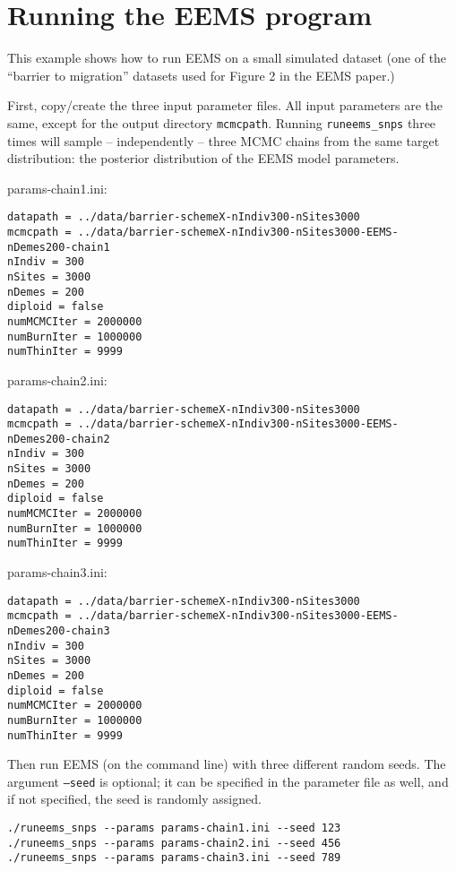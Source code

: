 \documentclass[a4paper,10pt,DIV=15,titlepage,mpinclude=true]{scrartcl}
\newcommand{\keystring}[1]{{\tt #1}}
\begin{document}
\newpage

\section{Running the EEMS program}\label{sec:running-eems}

This example shows how to run EEMS on a small simulated dataset (one of the ``barrier to migration'' datasets used for Figure 2 in the EEMS paper.)

First, copy/create the three input parameter files. All input parameters are the same, except for the output directory \keystring{mcmcpath}. Running \keystring{runeems\_snps} three times will sample -- independently -- three MCMC chains from the same target distribution: the posterior distribution of the EEMS model parameters.

\bigskip

\noindent params-chain1.ini:
\begin{lstlisting}[style=Cppcode]
datapath = ../data/barrier-schemeX-nIndiv300-nSites3000
mcmcpath = ../data/barrier-schemeX-nIndiv300-nSites3000-EEMS-nDemes200-chain1
nIndiv = 300
nSites = 3000
nDemes = 200
diploid = false
numMCMCIter = 2000000
numBurnIter = 1000000
numThinIter = 9999
\end{lstlisting}

\noindent params-chain2.ini:
\begin{lstlisting}[style=Cppcode]
datapath = ../data/barrier-schemeX-nIndiv300-nSites3000
mcmcpath = ../data/barrier-schemeX-nIndiv300-nSites3000-EEMS-nDemes200-chain2
nIndiv = 300
nSites = 3000
nDemes = 200
diploid = false
numMCMCIter = 2000000
numBurnIter = 1000000
numThinIter = 9999
\end{lstlisting}

\noindent params-chain3.ini:
\begin{lstlisting}[style=Cppcode]
datapath = ../data/barrier-schemeX-nIndiv300-nSites3000
mcmcpath = ../data/barrier-schemeX-nIndiv300-nSites3000-EEMS-nDemes200-chain3
nIndiv = 300
nSites = 3000
nDemes = 200
diploid = false
numMCMCIter = 2000000
numBurnIter = 1000000
numThinIter = 9999
\end{lstlisting}

Then run EEMS (on the command line) with three different random seeds. The argument \keystring{--seed} is optional; it can be specified in the parameter file as well, and if not specified, the seed is randomly assigned.

\begin{lstlisting}[style=Cppcode]
./runeems_snps --params params-chain1.ini --seed 123
./runeems_snps --params params-chain2.ini --seed 456
./runeems_snps --params params-chain3.ini --seed 789
\end{lstlisting}
\end{document}
